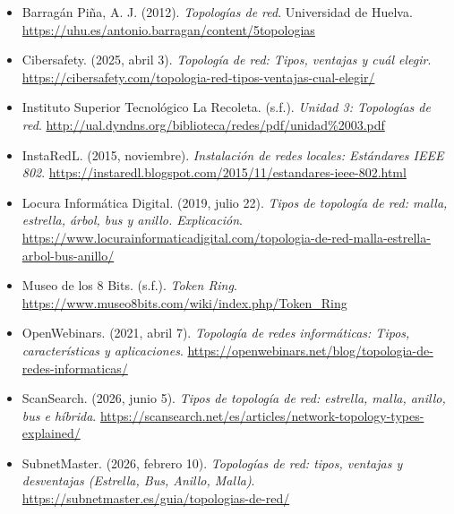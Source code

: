 \documentclass[12pt,letterpaper]{article}
\begin{document}
\begin{itemize}[leftmargin=1.5em,itemsep=8pt]

\item[] Barragán Piña, A. J. (2012). \textit{Topologías de red}. Universidad de Huelva. \url{https://uhu.es/antonio.barragan/content/5topologias}

\item[] Cibersafety. (2025, abril 3). \textit{Topología de red: Tipos, ventajas y cuál elegir}. \url{https://cibersafety.com/topologia-red-tipos-ventajas-cual-elegir/}

\item[] Instituto Superior Tecnológico La Recoleta. (s.f.). \textit{Unidad 3: Topologías de red}. \url{http://ual.dyndns.org/biblioteca/redes/pdf/unidad\%2003.pdf}

\item[] InstaRedL. (2015, noviembre). \textit{Instalación de redes locales: Estándares IEEE 802}. \url{https://instaredl.blogspot.com/2015/11/estandares-ieee-802.html}

\item[] Locura Informática Digital. (2019, julio 22). \textit{Tipos de topología de red: malla, estrella, árbol, bus y anillo. Explicación}. \url{https://www.locurainformaticadigital.com/topologia-de-red-malla-estrella-arbol-bus-anillo/}

\item[] Museo de los 8 Bits. (s.f.). \textit{Token Ring}. \url{https://www.museo8bits.com/wiki/index.php/Token_Ring}

\item[] OpenWebinars. (2021, abril 7). \textit{Topología de redes informáticas: Tipos, características y aplicaciones}. \url{https://openwebinars.net/blog/topologia-de-redes-informaticas/}

\item[] ScanSearch. (2026, junio 5). \textit{Tipos de topología de red: estrella, malla, anillo, bus e híbrida}. \url{https://scansearch.net/es/articles/network-topology-types-explained/}

\item[] SubnetMaster. (2026, febrero 10). \textit{Topologías de red: tipos, ventajas y desventajas (Estrella, Bus, Anillo, Malla)}. \url{https://subnetmaster.es/guia/topologias-de-red/}

\end{itemize}
\end{document}
